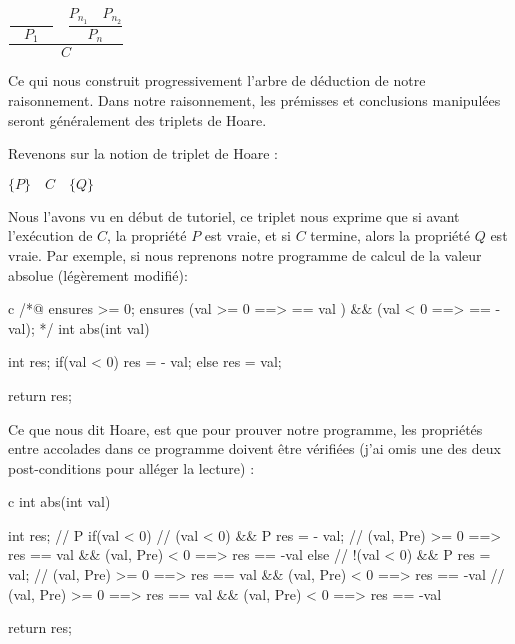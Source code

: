 \begin{center}
$\dfrac{\dfrac{}{\quad P_1\quad} \quad \dfrac{P_{n_1}\quad P_{n_2}}{P_n}}{C}$


\end{center}


Ce qui nous construit progressivement l'arbre de déduction de notre raisonnement.
Dans notre raisonnement, les prémisses et conclusions manipulées seront 
généralement des triplets de Hoare.





Revenons sur la notion de triplet de Hoare :




\begin{center}
$\{ P \}\quad  C\quad \{ Q \}$


\end{center}


Nous l'avons vu en début de tutoriel, ce triplet nous exprime que si avant 
l'exécution de $C$, la propriété $P$ est vraie, et si $C$ termine, alors la
propriété $Q$ est vraie. Par exemple, si nous reprenons notre programme de
calcul de la valeur absolue (légèrement modifié):



\begin{CodeBlock}{c}
/*@
  ensures \result >= 0;
  ensures (val >= 0 ==> \result == val ) && (val <  0 ==> \result == -val);
*/
int abs(int val){
  int res;
  if(val < 0) res = - val;
  else        res = val;

  return res;
}
\end{CodeBlock}



Ce que nous dit Hoare, est que pour prouver notre programme, les propriétés
entre accolades dans ce programme doivent être vérifiées (j'ai omis une des
deux post-conditions pour alléger la lecture) :



\begin{CodeBlock}{c}
int abs(int val){
  int res;
// { P }
  if(val < 0){
// {  (val < 0) && P }
    res = - val;
// { \at(val, Pre) >= 0 ==> res == val && \at(val, Pre) < 0 ==> res == -val }
  } else {
// { !(val < 0) && P }
    res = val;
// { \at(val, Pre) >= 0 ==> res == val && \at(val, Pre) < 0 ==> res == -val }
  }
// { \at(val, Pre) >= 0 ==> res == val && \at(val, Pre) < 0 ==> res == -val }

  return res;
}
\end{CodeBlock}




